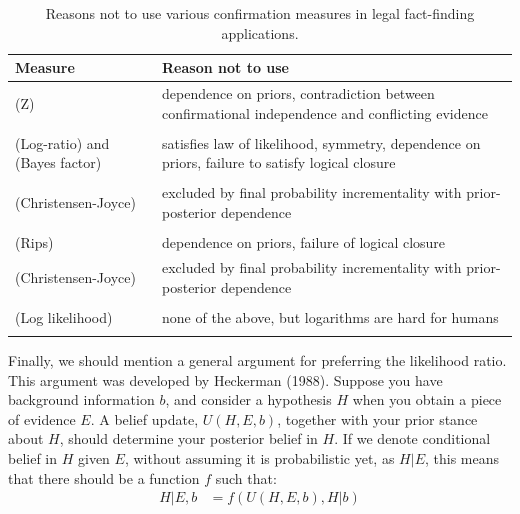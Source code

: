 \documentclass[
  letterpaper,
  DIV=11,
  numbers=noendperiod]{scrartcl}
\begin{document}
\begin{table}
\centering\begingroup\fontsize{9}{11}\selectfont

\begin{tabular}{lp{10cm}}
\toprule
Measure & Reason not to use\\
\midrule
(Z) & dependence on priors, contradiction between confirmational independence and  conflicting evidence\\
\cellcolor{gray!6}{(Difference)} & \cellcolor{gray!6}{dependence on priors, logical closure failure}\\
(Log-ratio) and (Bayes factor) & satisfies law of likelihood, symmetry, dependence on priors, failure to satisfy logical closure\\
\cellcolor{gray!6}{(Generalized entailment)} & \cellcolor{gray!6}{dependence on priors, independent conflicting evidence}\\
(Christensen-Joyce) & excluded by final probability incrementality with prior-posterior dependence\\
\cellcolor{gray!6}{(Carnap)} & \cellcolor{gray!6}{excluded by final probability incrementality with prior-posterior dependence, symmetry, logical closure failure}\\
(Rips) & dependence on priors, failure of logical closure\\
(Christensen-Joyce) & excluded by final probability incrementality with prior-posterior dependence\\
\cellcolor{gray!6}{(Kemeny-Oppenheim)} & \cellcolor{gray!6}{none of the above, but unnecessarily complex}\\
(Log likelihood) & none of the above, but logarithms are hard for humans\\
\cellcolor{gray!6}{(Likelihood ratio)} & \cellcolor{gray!6}{none of the above}\\
\bottomrule
\end{tabular}
\endgroup{}
\caption{Reasons not to use various confirmation measures in legal fact-finding applications.} 
\label{tbl:confirmation}
\end{table}

Finally, we should mention a general argument for preferring the
likelihood ratio. This argument was developed by Heckerman (1988).
Suppose you have background information \(b\), and consider a hypothesis
\(H\) when you obtain a piece of evidence \(E\). A belief update,
\(U(H, E, b)\), together with your prior stance about \(H\), should
determine your posterior belief in \(H\). If we denote conditional
belief in \(H\) given \(E\), without assuming it is probabilistic yet,
as \(H\vert E\), this means that there should be a function \(f\) such
that: \begin{align*}
H \vert E, b & = f(U(H,E,b), H \vert b)
\end{align*}
\end{document}
